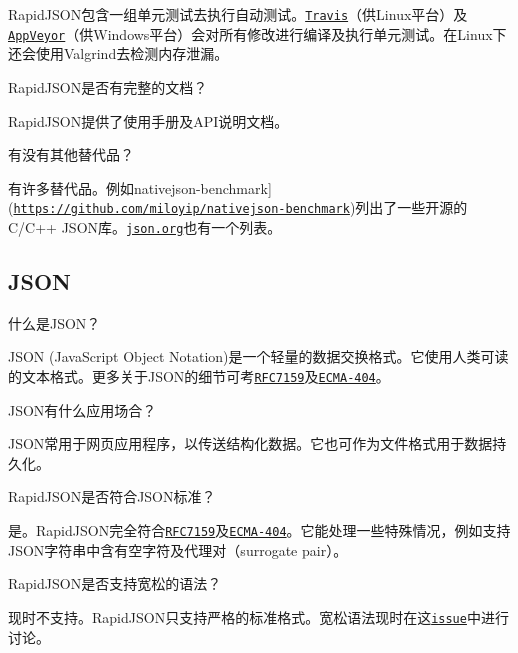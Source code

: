 \begin{DoxyEnumerate}
Rapid\+J\+S\+O\+N包含一组单元测试去执行自动测试。\href{https://travis-ci.org/miloyip/rapidjson/}{\tt Travis}（供\+Linux平台）及\href{https://ci.appveyor.com/project/miloyip/rapidjson/}{\tt App\+Veyor}（供\+Windows平台）会对所有修改进行编译及执行单元测试。在\+Linux下还会使用\+Valgrind去检测内存泄漏。
\item Rapid\+J\+S\+O\+N是否有完整的文档？

Rapid\+J\+S\+O\+N提供了使用手册及\+A\+P\+I说明文档。
\item 有没有其他替代品？

有许多替代品。例如nativejson-\/benchmark\mbox{]}(\href{https://github.com/miloyip/nativejson-benchmark}{\tt https\+://github.\+com/miloyip/nativejson-\/benchmark})列出了一些开源的\+C/\+C++ J\+S\+O\+N库。\href{http://www.json.org/}{\tt json.\+org}也有一个列表。
\end{DoxyEnumerate}

\subsection*{J\+S\+ON}


\begin{DoxyEnumerate}
\item 什么是\+J\+S\+O\+N？

J\+S\+ON (Java\+Script Object Notation)是一个轻量的数据交换格式。它使用人类可读的文本格式。更多关于\+J\+S\+O\+N的细节可考\href{http://www.ietf.org/rfc/rfc7159.txt}{\tt R\+F\+C7159}及\href{http://www.ecma-international.org/publications/standards/Ecma-404.htm}{\tt E\+C\+M\+A-\/404}。
\item J\+S\+O\+N有什么应用场合？

J\+S\+O\+N常用于网页应用程序，以传送结构化数据。它也可作为文件格式用于数据持久化。
\end{DoxyEnumerate}
\begin{DoxyEnumerate}
\item Rapid\+J\+S\+O\+N是否符合\+J\+S\+O\+N标准？

是。\+Rapid\+J\+S\+O\+N完全符合\href{http://www.ietf.org/rfc/rfc7159.txt}{\tt R\+F\+C7159}及\href{http://www.ecma-international.org/publications/standards/Ecma-404.htm}{\tt E\+C\+M\+A-\/404}。它能处理一些特殊情况，例如支持\+J\+S\+O\+N字符串中含有空字符及代理对（surrogate pair）。
\item Rapid\+J\+S\+O\+N是否支持宽松的语法？

现时不支持。\+Rapid\+J\+S\+O\+N只支持严格的标准格式。宽松语法现时在这\href{https://github.com/miloyip/rapidjson/issues/36}{\tt issue}中进行讨论。
\end{DoxyEnumerate}

